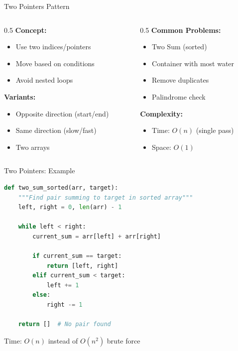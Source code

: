 \documentclass[aspectratio=169,xcolor=dvipsnames]{beamer}
\begin{document}
\begin{frame}{Two Pointers Pattern}
  \begin{columns}
    \begin{column}{0.5\textwidth}
      \textbf{Concept:}
      \begin{itemize}
        \item Use two indices/pointers
        \item Move based on conditions
        \item Avoid nested loops
      \end{itemize}

      \vspace{0.3cm}
      \textbf{Variants:}
      \begin{itemize}
        \item Opposite direction (start/end)
        \item Same direction (slow/fast)
        \item Two arrays
      \end{itemize}
    \end{column}

    \begin{column}{0.5\textwidth}
      \textbf{Common Problems:}
      \begin{itemize}
        \item Two Sum (sorted)
        \item Container with most water
        \item Remove duplicates
        \item Palindrome check
      \end{itemize}

      \vspace{0.3cm}
      \textbf{Complexity:}
      \begin{itemize}
        \item Time: $O(n)$ (single pass)
        \item Space: $O(1)$
      \end{itemize}
    \end{column}
  \end{columns}
\end{frame}

\begin{frame}[fragile]{Two Pointers: Example}
\begin{lstlisting}[language=Python]
def two_sum_sorted(arr, target):
    """Find pair summing to target in sorted array"""
    left, right = 0, len(arr) - 1

    while left < right:
        current_sum = arr[left] + arr[right]

        if current_sum == target:
            return [left, right]
        elif current_sum < target:
            left += 1
        else:
            right -= 1

    return []  # No pair found
\end{lstlisting}

Time: $O(n)$ instead of $O(n^2)$ brute force
\end{frame}
\end{document}
